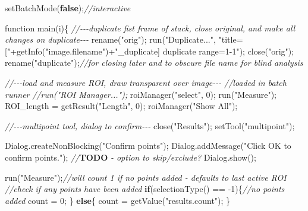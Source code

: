 \documentclass[
  12pt,
  a4paper,
]{book}
\newenvironment{Shaded}{}{}
\newcommand{\AlertTok}[1]{\textcolor[rgb]{1.00,0.00,0.00}{\textbf{#1}}}
\newcommand{\CommentTok}[1]{\textcolor[rgb]{0.38,0.63,0.69}{\textit{#1}}}
\newcommand{\ControlFlowTok}[1]{\textcolor[rgb]{0.00,0.44,0.13}{\textbf{#1}}}
\newcommand{\DecValTok}[1]{\textcolor[rgb]{0.25,0.63,0.44}{#1}}
\newcommand{\KeywordTok}[1]{\textcolor[rgb]{0.00,0.44,0.13}{\textbf{#1}}}
\newcommand{\NormalTok}[1]{#1}
\newcommand{\OperatorTok}[1]{\textcolor[rgb]{0.40,0.40,0.40}{#1}}
\newcommand{\StringTok}[1]{\textcolor[rgb]{0.25,0.44,0.63}{#1}}
\begin{document}
\begin{Shaded}
\begin{Highlighting}[]
\NormalTok{setBatchMode}\OperatorTok{(}\KeywordTok{false}\OperatorTok{);}\CommentTok{//interactive}

\NormalTok{function main}\OperatorTok{(}\NormalTok{i}\OperatorTok{)\{}
    \CommentTok{//{-}{-}{-}duplicate fist frame of stack, close original, and make all changes on duplicate{-}{-}{-}}
\NormalTok{    rename}\OperatorTok{(}\StringTok{"orig"}\OperatorTok{);}
\NormalTok{    run}\OperatorTok{(}\StringTok{"Duplicate..."}\OperatorTok{,} \StringTok{"title=["}\OperatorTok{+}\NormalTok{getInfo}\OperatorTok{(}\StringTok{"image.filename"}\OperatorTok{)+}\StringTok{"\_duplicate] duplicate range=1{-}1"}\OperatorTok{);}
\NormalTok{    close}\OperatorTok{(}\StringTok{"orig"}\OperatorTok{);}
\NormalTok{    rename}\OperatorTok{(}\StringTok{"duplicate"}\OperatorTok{);}\CommentTok{//for closing later and to obscure file name for blind analysis}

    \CommentTok{//{-}{-}{-}load and measure ROI, draw transparent over image{-}{-}{-}}
    \CommentTok{//loaded in batch runner}
    \CommentTok{//run("ROI Manager...");}
\NormalTok{    roiManager}\OperatorTok{(}\StringTok{"select"}\OperatorTok{,} \DecValTok{0}\OperatorTok{);}
\NormalTok{    run}\OperatorTok{(}\StringTok{"Measure"}\OperatorTok{);}
\NormalTok{    ROI\_length }\OperatorTok{=}\NormalTok{ getResult}\OperatorTok{(}\StringTok{"Length"}\OperatorTok{,} \DecValTok{0}\OperatorTok{);}
\NormalTok{    roiManager}\OperatorTok{(}\StringTok{"Show All"}\OperatorTok{);}

    \CommentTok{//{-}{-}{-}multipoint tool, dialog to confirm{-}{-}{-}}
\NormalTok{    close}\OperatorTok{(}\StringTok{"Results"}\OperatorTok{);}
\NormalTok{    setTool}\OperatorTok{(}\StringTok{"multipoint"}\OperatorTok{);}
        
\NormalTok{    Dialog}\OperatorTok{.}\NormalTok{createNonBlocking}\OperatorTok{(}\StringTok{"Confirm points"}\OperatorTok{);}
\NormalTok{    Dialog}\OperatorTok{.}\NormalTok{addMessage}\OperatorTok{(}\StringTok{"Click \textquotesingle{}OK\textquotesingle{} to confirm points."}\OperatorTok{);}
    \CommentTok{//}\AlertTok{TODO}\CommentTok{ {-} option to skip/exclude?}
\NormalTok{    Dialog}\OperatorTok{.}\NormalTok{show}\OperatorTok{();}
    
\NormalTok{    run}\OperatorTok{(}\StringTok{"Measure"}\OperatorTok{);}\CommentTok{//will count 1 if no points added {-} defaults to last active ROI}
    \CommentTok{//check if any points have been added}
    \ControlFlowTok{if}\OperatorTok{(}\NormalTok{selectionType}\OperatorTok{()} \OperatorTok{==} \OperatorTok{{-}}\DecValTok{1}\OperatorTok{)\{}\CommentTok{//no points added}
\NormalTok{        count }\OperatorTok{=} \DecValTok{0}\OperatorTok{;}
    \OperatorTok{\}}
    \ControlFlowTok{else}\OperatorTok{\{}
\NormalTok{        count }\OperatorTok{=}\NormalTok{ getValue}\OperatorTok{(}\StringTok{"results.count"}\OperatorTok{);}
    \OperatorTok{\}}
        

\end{Highlighting}
\end{Shaded}
\end{document}

